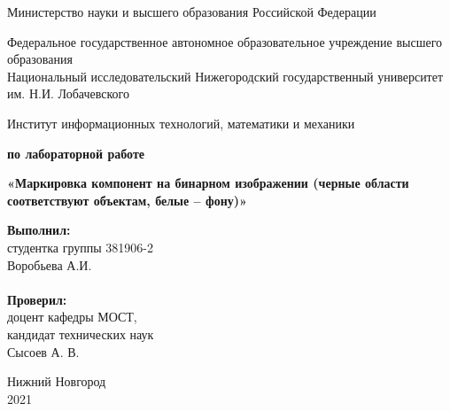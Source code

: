 \documentclass{report}
\begin{document}
\begin{titlepage}

\begin{center}
Министерство науки и высшего образования Российской Федерации
\end{center}

\begin{center}
Федеральное государственное автономное образовательное учреждение высшего образования \\
Национальный исследовательский Нижегородский государственный университет им. Н.И. Лобачевского
\end{center}

\begin{center}
Институт информационных технологий, математики и механики
\end{center}

\vspace{4em}

\begin{center}
\textbf{ по лабораторной работе} \\
\end{center}
\begin{center}
\textbf{\Large«Маркировка компонент на бинарном изображении (черные области соответствуют объектам, белые – фону)»} \\
\end{center}

\vspace{4em}

\newbox{\lbox}
\newlength{\maxl}
\setlength{\maxl}{\wd\lbox}
\hfill\parbox{7cm}{
\hspace*{5cm}\hspace*{-5cm}\textbf{Выполнил:} \\ студентка группы 381906-2 \\ Воробьева А.И.\\
\\
\hspace*{5cm}\hspace*{-5cm}\textbf{Проверил:}\\ доцент кафедры МОСТ, \\ кандидат технических наук \\ Сысоев А. В.\\
}
\vspace{\fill}

\begin{center} Нижний Новгород \\ 2021 \end{center}

\end{titlepage}
\end{document}

